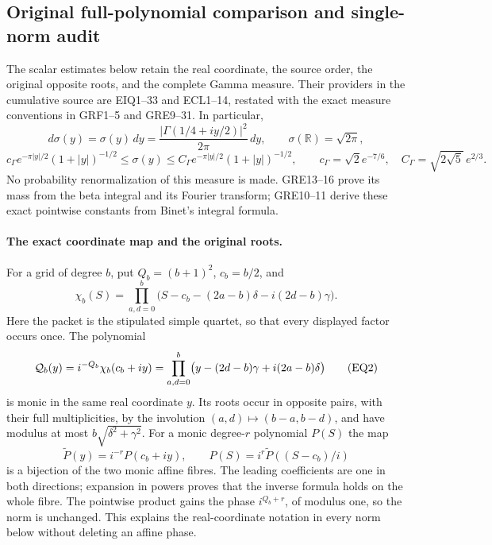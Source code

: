 
\subsection{Original full-polynomial comparison and single-norm audit}
\label{eqreview:section}

The scalar estimates below retain the real coordinate, the source order,
the original opposite roots, and the complete Gamma measure.  Their
providers in the cumulative source are EIQ1--33 and ECL1--14, restated
with the exact measure conventions in GRF1--5 and GRE9--31.  In particular,
\[
 d\sigma(y)=\sigma(y)\,dy
   =\frac{|\Gamma(1/4+iy/2)|^2}{2\pi}\,dy,\qquad
 \sigma(\mathbb R)=\sqrt{2\pi},
\]
\[
 c_\Gamma e^{-\pi|y|/2}(1+|y|)^{-1/2}
 \le \sigma(y)\le
 C_\Gamma e^{-\pi|y|/2}(1+|y|)^{-1/2},\qquad
 c_\Gamma=\sqrt2 e^{-7/6},\quad
 C_\Gamma=\sqrt{2\sqrt5}\,e^{2/3}.
\tag{EQ1}
\]
No probability renormalization of this measure is made.  GRE13--16
prove its mass from the beta integral and its Fourier transform; GRE10--11
derive these exact pointwise constants from Binet's integral formula.

\paragraph{The exact coordinate map and the original roots.}
For a grid of degree \(b\), put \(Q_b=(b+1)^2\), \(c_b=b/2\), and
\[
 \chi_b(S)=\prod_{a,d=0}^{b}
   \bigl(S-c_b-(2a-b)\delta-i(2d-b)\gamma\bigr).
\]
Here the packet is the stipulated simple quartet, so that every displayed
factor occurs once.  The polynomial
\[
 {\cal Q}_b(y)=i^{-Q_b}\chi_b(c_b+iy)
 =\prod_{a,d=0}^{b}
   \bigl(y-(2d-b)\gamma+i(2a-b)\delta\bigr)
\tag{EQ2}
\]
is monic in the same real coordinate \(y\).  Its roots occur in opposite
pairs, with their full multiplicities, by the involution
\((a,d)\mapsto(b-a,b-d)\), and have modulus at most
\(b\sqrt{\delta^2+\gamma^2}\).  For a monic degree-\(r\) polynomial \(P(S)\)
the map
\[
 \widetilde P(y)=i^{-r}P(c_b+iy),\qquad
 P(S)=i^r\widetilde P((S-c_b)/i)
\tag{EQ3}
\]
is a bijection of the two monic affine fibres.  The leading coefficients
are one in both directions; expansion in powers proves that the inverse
formula holds on the whole fibre.  The pointwise product gains the phase
\(i^{Q_b+r}\), of modulus one, so the norm is unchanged.  This explains
the real-coordinate notation in every norm below without deleting an
affine phase.

